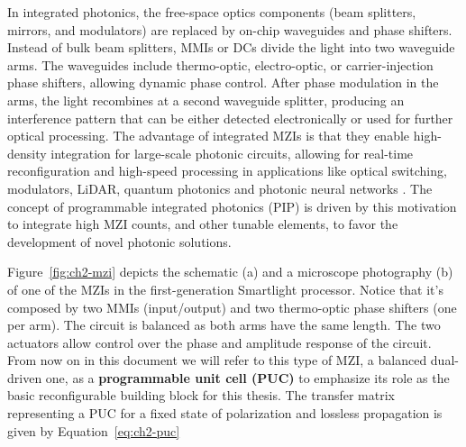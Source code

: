 In integrated photonics, the free-space optics components (beam splitters, mirrors, and modulators) are replaced by on-chip waveguides and phase shifters.
Instead of bulk beam splitters, MMIs or DCs divide the light into two waveguide arms.
The waveguides include thermo-optic, electro-optic, or carrier-injection phase shifters, allowing dynamic phase control.
After phase modulation in the arms, the light recombines at a second waveguide splitter, producing an interference pattern that can be either detected electronically or used for further optical processing.
The advantage of integrated MZIs is that they enable high-density integration for large-scale photonic circuits, allowing for real-time reconfiguration and high-speed processing in applications like optical switching, modulators, LiDAR, quantum photonics and photonic neural networks \cite{capmany_programmable_2020}.
The concept of programmable integrated photonics (PIP) is driven by this motivation to integrate high MZI counts, and other tunable elements, to favor the development of novel photonic solutions.

Figure~\ref{fig:ch2-mzi} depicts the schematic (a) and a microscope photography (b) of one of the MZIs in the first-generation Smartlight processor.
Notice that it's composed by two MMIs (input/output) and two thermo-optic phase shifters (one per arm).
The circuit is balanced as both arms have the same length.
The two actuators allow control over the phase and amplitude response of the circuit.
From now on in this document we will refer to this type of MZI, a balanced dual-driven one, as a \textbf{programmable unit cell (PUC)} to emphasize its role as the basic reconfigurable building block for this thesis.
The transfer matrix representing a PUC for a fixed state of polarization and lossless propagation is given by Equation~\eqref{eq:ch2-puc}

